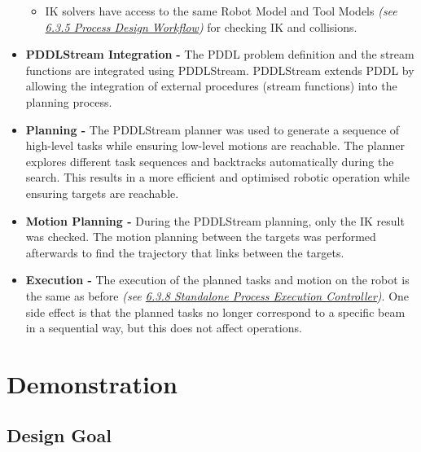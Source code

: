 \begin{itemize}
\begin{itemize}
	\item IK solvers have access to the same Robot Model and Tool Models \textit{(see \uline{6.3.5 Process Design Workflow})} for checking IK and collisions.

\end{itemize}
	\item \textbf{PDDLStream Integration} \textbf{-} The PDDL problem definition and the stream functions are integrated using PDDLStream. PDDLStream extends PDDL by allowing the integration of external procedures (stream functions) into the planning process.

	\item \textbf{Planning - }The PDDLStream planner was used to generate a sequence of high-level tasks while ensuring low-level motions are reachable. The planner explores different task sequences and backtracks automatically during the search. This results in a more efficient and optimised robotic operation while ensuring targets are reachable.

	\item \textbf{Motion Planning - }During the PDDLStream planning, only the IK result was checked. The motion planning between the targets was performed afterwards to find the trajectory that links between the targets.

	\item \textbf{Execution - }The execution of the planned tasks and motion on the robot is the same as before \textit{(see \uline{6.3.8 Standalone Process Execution Controller})}. One side effect is that the planned tasks no longer correspond to a specific beam in a sequential way, but this does not affect operations.

\end{itemize}
\section{Demonstration}

\subsection{Design Goal}

